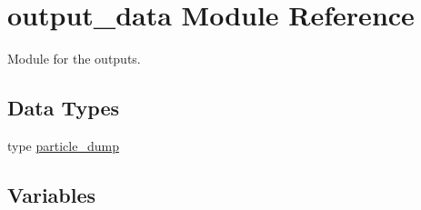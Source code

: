 \hypertarget{namespaceoutput__data}{}\section{output\+\_\+data Module Reference}
\label{namespaceoutput__data}


Module for the outputs.  


\subsection*{Data Types}
\begin{DoxyCompactItemize}
\item 
type \hyperlink{structoutput__data_1_1particle__dump}{particle\+\_\+dump}
\end{DoxyCompactItemize}
\subsection*{Variables}
